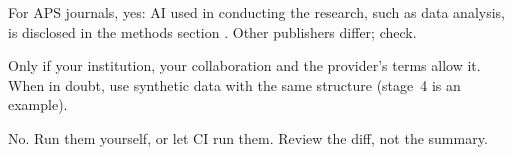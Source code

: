 \begin{qa}
For APS journals, yes: AI used in conducting the research, such as data analysis, is
disclosed in the methods section . Other publishers differ; check.

Only if your institution, your collaboration and the provider's terms allow it. When in
doubt, use synthetic data with the same structure (stage~4 is an example).

No. Run them yourself, or let CI run them. Review the diff, not the summary.
\end{qa}
